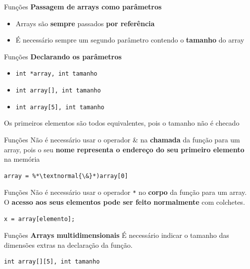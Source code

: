 \documentclass[10pt]{beamer}
\begin{document}
\begin{frame}{Funções}
  \huge
  \textbf{Passagem de arrays como parâmetros}
  \vfill
  \Large
  \begin{itemize}
    \item Arrays são \textbf{sempre} passados \textbf{por referência}
    \item É necessário sempre um segundo parâmetro contendo o \textbf{tamanho} do array
  \end{itemize}

\end{frame}

\begin{frame}{Funções}
  \huge
  \textbf{Declarando os parâmetros}
  \vfill
  \LARGE
  \begin{itemize}
    \item \texttt{int *array, int tamanho}
    \item \texttt{int array[], int tamanho}
    \item \texttt{int array[5], int tamanho}
  \end{itemize}
  \vfill
  \large
  Os primeiros elementos são todos equivalentes, pois o tamanho não é checado
\end{frame}

\begin{frame}[fragile]{Funções}
  \LARGE
  Não é necessário usar o operador \& na \textbf{chamada} da função para um array, pois o seu \textbf{nome representa o endereço do seu primeiro elemento} na memória
  \vfill
  \begin{lstlisting}
array = %*\textnormal{\&}*)array[0]
  \end{lstlisting}
\end{frame}

\begin{frame}[fragile]{Funções}
  \LARGE
  Não é necessário usar o operador \texttt{*} no \textbf{corpo} da função para um array. O \textbf{acesso aos seus elementos pode ser feito normalmente} com colchetes.
  \vfill
  \begin{lstlisting}
x = array[elemento];
  \end{lstlisting}
\end{frame}

\begin{frame}[fragile]{Funções}
  \huge
  \textbf{Arrays multidimensionais}
  \vfill
  \Large
  É necessário indicar o tamanho das dimensões extras na declaração da função.
  \vfill
  \begin{verbatim}
int array[][5], int tamanho
  \end{verbatim}

\end{frame}
\end{document}
